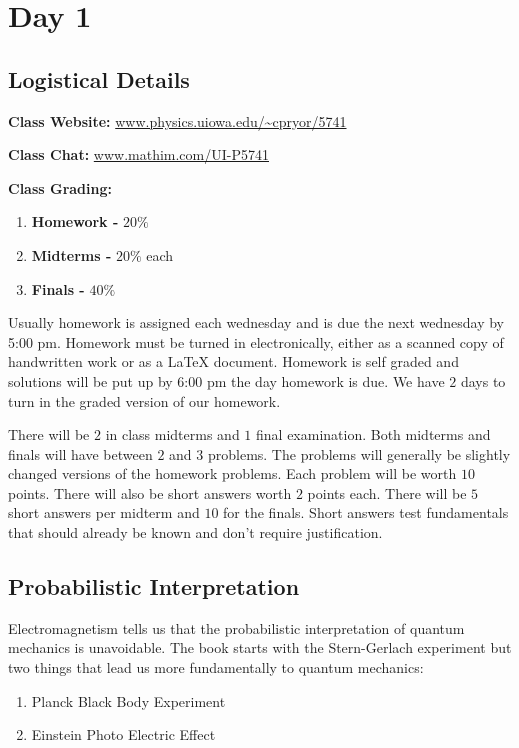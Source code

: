 \section{Day 1}

\subsection{Logistical Details}

\textbf{Class Website:} \url{www.physics.uiowa.edu/~cpryor/5741}

\textbf{Class Chat:} \url{www.mathim.com/UI-P5741}

\noindent \textbf{Class Grading:}

\begin{enumerate}
  \item \textbf{Homework -} $20\%$
  \item \textbf{Midterms -} $20\%$ each
  \item \textbf{Finals -} $40\%$
\end{enumerate}

Usually homework is assigned each wednesday and is due the next wednesday by 5:00 pm. Homework must be turned in electronically, either as a scanned copy of handwritten work or as a \LaTeX{} document. Homework is self graded and solutions will be put up by 6:00 pm the day homework is due. We have $2$ days to turn in the graded version of our homework.

There will be $2$ in class midterms and $1$ final examination. Both midterms and finals will have between $2$ and $3$ problems. The problems will generally be slightly changed versions of the homework problems. Each problem will be worth $10$ points. There will also be short answers worth $2$ points each. There will be $5$ short answers per midterm and $10$ for the finals. Short answers test fundamentals that should already be known and don't require justification.

\subsection{Probabilistic Interpretation}

Electromagnetism tells us that the probabilistic interpretation of quantum mechanics is unavoidable. The book starts with the Stern-Gerlach experiment but two things that lead us more fundamentally to quantum mechanics:

\begin{enumerate}
  \item Planck Black Body Experiment
  \item Einstein Photo Electric Effect
\end{enumerate}

